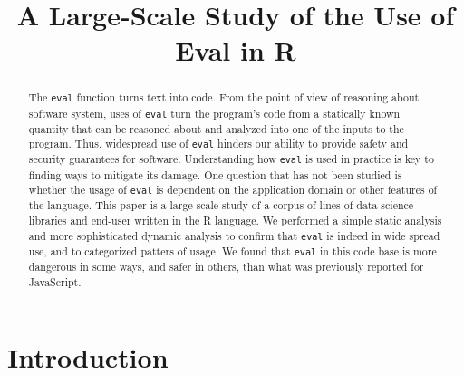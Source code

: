 \documentclass[conference]{IEEEtran}
\begin{document}
\title{A Large-Scale Study of the Use of Eval in R}
\author{\vspace{-.8cm}\IEEEauthorblockN{~}} %
\maketitle

\newcommand{\eg}{\emph{e.g.},\xspace}
\newcommand{\ie}{\emph{i.e.},\xspace}
\newcommand{\cf}{\emph{cf.}\xspace}

\newcommand{\eval}{\texttt{eval}\xspace}
\renewcommand{\c}[1]{\lstinline{#1}\xspace}
\newcommand{\miss}[1]{{\textcolor{red}{#1}}\xspace}

\begin{abstract}
  The \eval function turns text into code. From the point of view of
  reasoning about software system, uses of \eval turn the program's code
  from a statically known quantity that can be reasoned about and analyzed
  into one of the inputs to the program. Thus, widespread use of \eval
  hinders our ability to provide safety and security guarantees for
  software. Understanding how \eval is used in practice is key to finding
  ways to mitigate its damage. One question that has not been studied is
  whether the usage of \eval is dependent on the application domain or other
  features of the language. This paper is a large-scale study of a corpus of
  \CorpusAllCodeRnd lines of data science libraries and end-user written in
  the R language. We performed a simple static analysis and more
  sophisticated dynamic analysis to confirm that \eval is indeed in wide
  spread use, and to categorized patters of usage. We found that \eval in
  this code base is more dangerous in some ways, and safer in others, than
  what was previously reported for JavaScript.
\end{abstract}

\section{Introduction}
\end{document}
